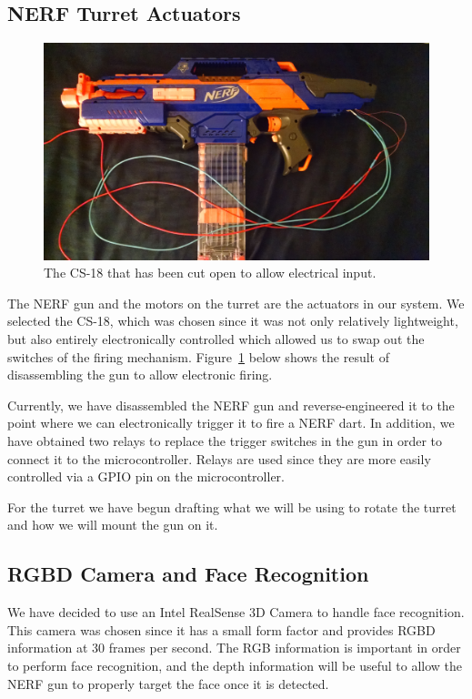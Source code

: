 \documentclass[journal]{IEEEtran}
\begin{document}
\subsection{NERF Turret Actuators}

\begin{figure}[htbp]
    \centering
    \includegraphics[width=0.80\linewidth]{gun.jpg}
    \caption{The CS-18 that has been cut open to allow electrical input.}
    \label{fig:gun}
\end{figure}

The NERF gun and the motors on the turret are the actuators in our system. We selected the CS-18, which was chosen since it was not only relatively lightweight, but also entirely electronically controlled which allowed us to swap out the switches of the firing mechanism. Figure~\ref{fig:gun} below shows the result of disassembling the gun to allow electronic firing.

Currently, we have disassembled the NERF gun and reverse-engineered it to the point where we can electronically trigger it to fire a NERF dart. In addition, we have obtained two relays to replace the trigger switches in the gun in order to connect it to the microcontroller. Relays are used since they are more easily controlled via a GPIO pin on the microcontroller.

For the turret we have begun drafting what we will be using to rotate the turret and how we will mount the gun on it.

\subsection{RGBD Camera and Face Recognition}

We have decided to use an Intel RealSense 3D Camera to handle face recognition. This camera was chosen since it has a small form factor and provides RGBD information at 30 frames per second. The RGB information is important in order to perform face recognition, and the depth information will be useful to allow the NERF gun to properly target the face once it is detected.
\end{document}
